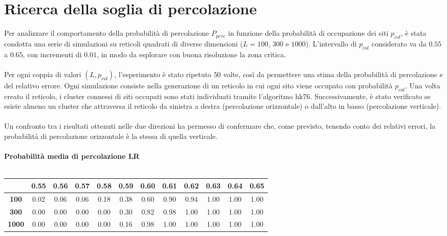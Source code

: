 \section{Ricerca della soglia di percolazione}
Per analizzare il comportamento della probabilità di percolazione $P_{perc}$ in funzione della probabilità di occupazione dei siti $p_{col}$, è stata condotta una serie di simulazioni su reticoli quadrati di diverse dimensioni ($L = 100$, $300$ e $1000$). L’intervallo di $p_{col}$ considerato va da $0.55$ a $0.65$, con incrementi di $0.01$, in modo da esplorare con buona risoluzione la zona critica.
\\\\
\noindent
Per ogni coppia di valori $(L, p_{col})$, l’esperimento è stato ripetuto $50$ volte, così da permettere una stima della probabilità di percolazione e del relativo errore. Ogni simulazione consiste nella generazione di un reticolo in cui ogni sito viene occupato con probabilità $p_{col}$. Una volta creato il reticolo, i cluster connessi di siti occupati sono stati individuati tramite l'algoritmo hk76. Successivamente, è stato verificato se esiste almeno un cluster che attraversa il reticolo da sinistra a destra (percolazione orizzontale) o dall’alto in basso (percolazione verticale).
\\\\
\noindent
Un confronto tra i risultati ottenuti nelle due direzioni ha permesso di confermare che, come previsto, tenendo conto dei relativi errori, la probabilità di percolazione orizzontale è la stessa di quella verticale.
\\\\
\textbf{Probabilità media di percolazione LR}
\\\\
\noindent
\begin{tabular}{|c|*{11}{c|}}
	\hline
	\textbf{}&\textbf{0.55} &	\textbf{0.56}& \textbf{0.57} &	\textbf{0.58}	& \textbf{0.59}& 	\textbf{0.60}&	\textbf{0.61}&\textbf{	0.62}&	\textbf{0.63}& \textbf{0.64} &\textbf{0.65}	\\
	\hline
	
	\textbf{100} &0.02 &	0.06& 0.06 &	0.18	& 0.38& 	0.60&	0.90&	0.94&	1.00 &	1.00 &	1.00\\
	\hline

	\textbf{300} & 0.00	& 0.00	& 0.00&	0.00&	0.30 & 0.82 &	0.98&	1.00&1.00&1.00&1.00\\
	\hline
	\textbf{1000}& 0.00&	0.00	&0.00	&0.00	&0.16&	0.98&	1.00&	1.00 & 1.00 & 1.00 & 1.00\\
	\hline
\end{tabular}
\vspace{15px}

